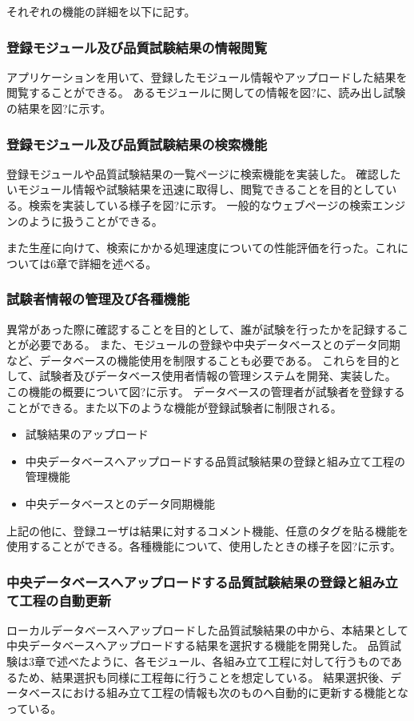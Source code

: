 それぞれの機能の詳細を以下に記す。

\subsubsection{登録モジュール及び品質試験結果の情報閲覧}
アプリケーションを用いて、登録したモジュール情報やアップロードした結果を閲覧することができる。
あるモジュールに関しての情報を図?に、読み出し試験の結果を図?に示す。

\subsubsection{登録モジュール及び品質試験結果の検索機能}
登録モジュールや品質試験結果の一覧ページに検索機能を実装した。
確認したいモジュール情報や試験結果を迅速に取得し、閲覧できることを目的としている。検索を実装している様子を図?に示す。
一般的なウェブページの検索エンジンのように扱うことができる。

また生産に向けて、検索にかかる処理速度についての性能評価を行った。これについては6章で詳細を述べる。

\subsubsection{試験者情報の管理及び各種機能}

異常があった際に確認することを目的として、誰が試験を行ったかを記録することが必要である。
また、モジュールの登録や中央データベースとのデータ同期など、データベースの機能使用を制限することも必要である。
これらを目的として、試験者及びデータベース使用者情報の管理システムを開発、実装した。
この機能の概要について図?に示す。
データベースの管理者が試験者を登録することができる。また以下のような機能が登録試験者に制限される。

\begin{itemize}
  \item 試験結果のアップロード
  \item 中央データベースへアップロードする品質試験結果の登録と組み立て工程の管理機能
  \item 中央データベースとのデータ同期機能
\end{itemize}

上記の他に、登録ユーザは結果に対するコメント機能、任意のタグを貼る機能を使用することができる。各種機能について、使用したときの様子を図?に示す。

\subsubsection{中央データベースへアップロードする品質試験結果の登録と組み立て工程の自動更新}
ローカルデータベースへアップロードした品質試験結果の中から、本結果として中央データベースへアップロードする結果を選択する機能を開発した。
品質試験は3章で述べたように、各モジュール、各組み立て工程に対して行うものであるため、結果選択も同様に工程毎に行うことを想定している。
結果選択後、データベースにおける組み立て工程の情報も次のものへ自動的に更新する機能となっている。

